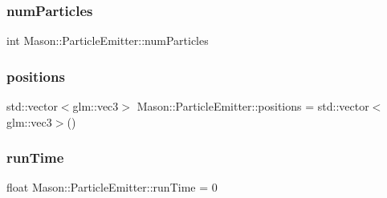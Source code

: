 \hypertarget{class_mason_1_1_particle_emitter_a2df785f58db33ede9255ba835e955e11}{}\label{class_mason_1_1_particle_emitter_a2df785f58db33ede9255ba835e955e11} 
\subsubsection{\texorpdfstring{num\+Particles}{numParticles}}
{\footnotesize\ttfamily int Mason\+::\+Particle\+Emitter\+::num\+Particles\hspace{0.3cm}{\ttfamily [protected]}}

\hypertarget{class_mason_1_1_particle_emitter_a9398d92e4bed89396c02d4c028ba3e69}{}\label{class_mason_1_1_particle_emitter_a9398d92e4bed89396c02d4c028ba3e69} 
\subsubsection{\texorpdfstring{positions}{positions}}
{\footnotesize\ttfamily std\+::vector$<$glm\+::vec3$>$ Mason\+::\+Particle\+Emitter\+::positions = std\+::vector$<$glm\+::vec3$>$()\hspace{0.3cm}{\ttfamily [protected]}}

\hypertarget{class_mason_1_1_particle_emitter_a5ae9088b02fdfd269dfd34c2a092e384}{}\label{class_mason_1_1_particle_emitter_a5ae9088b02fdfd269dfd34c2a092e384} 
\subsubsection{\texorpdfstring{run\+Time}{runTime}}
{\footnotesize\ttfamily float Mason\+::\+Particle\+Emitter\+::run\+Time = 0\hspace{0.3cm}{\ttfamily [protected]}}

\hypertarget{class_mason_1_1_particle_emitter_abd604dd44e85f836580c40bf8d147a2c}{}\label{class_mason_1_1_particle_emitter_abd604dd44e85f836580c40bf8d147a2c} 
